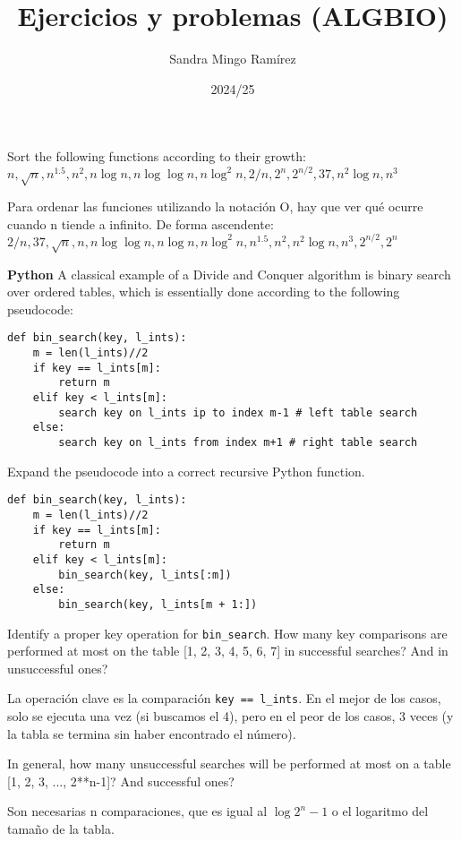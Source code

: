 \documentclass[nochap]{config/ejercicios}
\title{Ejercicios y problemas (ALGBIO)}
\author{Sandra Mingo Ramírez}
\date{2024/25}
\begin{document}
\maketitle

\begin{problemS}
Sort the following functions according to their growth: \\
$n, \sqrt{n}, n^{1.5}, n^2, n \log n, n \log \log n, n \log^2 n, 2/n, 2^n, 2^{n/2}, 37, n^2 \log n, n^3$

Para ordenar las funciones utilizando la notación O, hay que ver qué ocurre cuando n tiende a infinito. De forma ascendente: \\
$2/n, 37,\sqrt{n}, n, n \log \log n, n \log n, n \log^2 n, n^{1.5}, n^2, n^2 \log n, n^3, 2^{n/2}, 2^n$
\end{problemS}

\begin{problemS} \textbf{Python}
A classical example of a Divide and Conquer algorithm is binary search over ordered tables, which is essentially done according to the following pseudocode:
\begin{lstlisting}
def bin_search(key, l_ints):
	m = len(l_ints)//2
	if key == l_ints[m]:
		return m
	elif key < l_ints[m]:
		search key on l_ints ip to index m-1 # left table search
	else:
		search key on l_ints from index m+1 # right table search
\end{lstlisting}

Expand the pseudocode into a correct recursive Python function.
\begin{lstlisting}
def bin_search(key, l_ints):
	m = len(l_ints)//2
	if key == l_ints[m]:
		return m
	elif key < l_ints[m]:
		bin_search(key, l_ints[:m])
	else:
		bin_search(key, l_ints[m + 1:])
\end{lstlisting}
\end{problemS}

\begin{problemS}
Identify a proper key operation for \texttt{bin\_search}. How many key comparisons are performed at most on the table [1, 2, 3, 4, 5, 6, 7] in successful searches? And in unsuccessful ones?

La operación clave es la comparación \texttt{key == l\_ints}. En el mejor de los casos, solo se ejecuta una vez (si buscamos el 4), pero en el peor de los casos, 3 veces (y la tabla se termina sin haber encontrado el número).
\end{problemS}

\begin{problemS}
In general, how many unsuccessful searches will be performed at most on a table [1, 2, 3, ..., 2**n-1]? And successful ones?

Son necesarias n comparaciones, que es igual al $\log 2^n - 1$ o el logaritmo del tamaño de la tabla.
\end{problemS}
\end{document}
